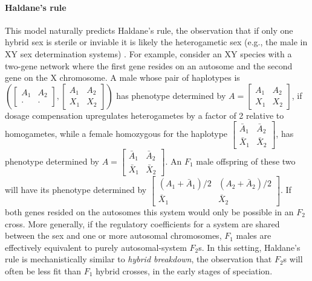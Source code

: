 \documentclass{article}
\newcommand{\1}{\mathbbm{1}}
\begin{document}
\paragraph{Haldane's rule}
This model naturally predicts
Haldane's rule, the observation that if only one hybrid sex is sterile or inviable 
it is likely the heterogametic sex (e.g., the male in XY sex determination systems) \citep{haldane1922sex}.
For example, consider an XY species with a two-gene network where the first gene resides on an autosome and the second gene on the X chromosome.
A male whose pair of haplotypes is 
$\left( \left[ \begin{smallmatrix} A_1 & A_2 \\ \cdot & \cdot \end{smallmatrix} \right], \left[ \begin{smallmatrix} A_1 & A_2 \\ X_1 & X_2 \end{smallmatrix} \right] \right)$
has phenotype determined by $A = \left[ \begin{smallmatrix} A_1 & A_2 \\ X_1 & X_2 \end{smallmatrix} \right]$, 
if dosage compensation upregulates heterogametes by a factor of 2 relative to homogametes,
while a female homozygous for the haplotype
$\left[\begin{smallmatrix} \bar A_1 & \bar A_2 \\ \bar X_1 & \bar X_2 \end{smallmatrix}\right]$, has phenotype determined by
$A = \left[\begin{smallmatrix} \bar A_1 & \bar A_2 \\ \bar X_1 & \bar X_2 \end{smallmatrix}\right]$.
An $F_1$ male offspring of these two will have its phenotype determined by
$\left[\begin{smallmatrix} (A_1 + \bar A_1)/2 & (A_2 + \bar A_2)/2 \\ \bar X_1 & \bar X_2 \end{smallmatrix}\right]$.
If both genes resided on the autosomes this system would only be possible in an $F_2$ cross.
More generally, 
if the regulatory coefficients for a system are shared between the sex and one or more autosomal chromosomes, 
$F_1$ males are effectively equivalent to purely autosomal-system $F_2$s. 
In this setting, Haldane's rule is mechanistically similar to \emph{hybrid breakdown}, the observation that $F_2$s will often be less fit than $F_1$ hybrid crosses, in the early stages of speciation.
\end{document}
